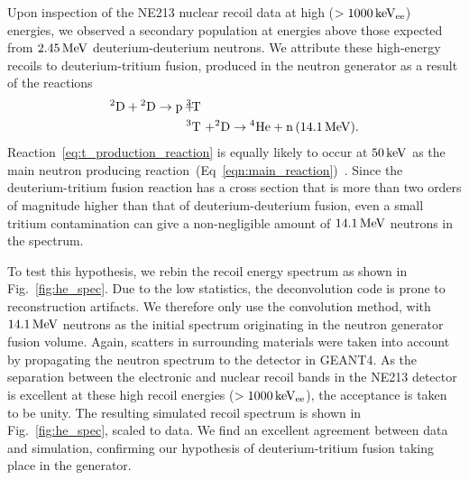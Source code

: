 Upon inspection of the NE213 nuclear recoil data at high ($>1000\,\mathrm{keV_{ee}}$) energies, we observed a secondary population at energies above those expected from $2.45\,\mathrm{MeV}$ deuterium-deuterium neutrons. We attribute these high-energy recoils to deuterium-tritium fusion, produced in the neutron generator as a result of the reactions
\begin{eqnarray}
{}^2\mathrm{D} + {}^2\mathrm{D} \rightarrow \mathrm{p}\, + &\!\!\!\!{}^3\mathrm{T}\!\!\!\!& \label{eq:t_production_reaction} \\
&\!\!\!\!^3\mathrm{T}\!\!\!\!& + {}^2\mathrm{D} \rightarrow {}^4\mathrm{He} + \mathrm{n}\,(14.1\1{MeV}).
\end{eqnarray}
Reaction~\eqref{eq:t_production_reaction} is equally likely to occur at $50\,\mathrm{keV}$ as the main neutron producing reaction~(Eq~\eqref{eqn:main_reaction})~\cite{Huba:2013}. Since the deuterium-tritium fusion reaction has a cross section that is more than two orders of magnitude higher than that of deuterium-deuterium fusion, even a small tritium contamination can give a non-negligible amount of $14.1\,\mathrm{MeV}$ neutrons in the spectrum.

To test this hypothesis, we rebin the recoil energy spectrum as shown in Fig.~\ref{fig:he_spec}. Due to the low statistics, the deconvolution code is prone to reconstruction artifacts. We therefore only use the convolution method, with $14.1\,\mathrm{MeV}$ neutrons as the initial spectrum originating in the neutron generator fusion volume. Again, scatters in surrounding materials were taken into account by propagating the neutron spectrum to the detector in GEANT4. As the separation between the electronic and nuclear recoil bands in the NE213 detector is excellent at these high recoil energies ($>1000\,\mathrm{keV_{ee}}$), the acceptance is taken to be unity. The resulting simulated recoil spectrum is shown in Fig.~\ref{fig:he_spec}, scaled to data. We find an excellent agreement between data and simulation, confirming our hypothesis of deuterium-tritium fusion taking place in the generator.

